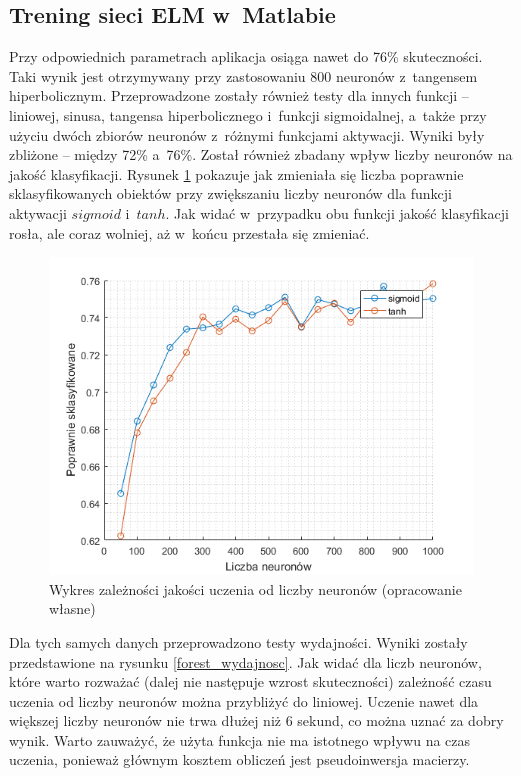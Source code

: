 \documentclass[pl]{minipw} %
\begin{document}
\subsection{Trening sieci ELM w~Matlabie}
Przy odpowiednich parametrach aplikacja osiąga nawet do 76\% skuteczności. 
Taki wynik jest otrzymywany przy zastosowaniu 800 neuronów z~tangensem hiperbolicznym.
Przeprowadzone zostały również testy dla innych funkcji -- liniowej, sinusa, tangensa hiperbolicznego i~funkcji sigmoidalnej, a~także przy użyciu dwóch zbiorów neuronów z~różnymi funkcjami aktywacji.
Wyniki były zbliżone -- między 72\% a~76\%.
\label{matlab-lasy}
Został również zbadany wpływ liczby neuronów na jakość klasyfikacji.
Rysunek \ref{forest_liczba_neuronow} pokazuje jak zmieniała się liczba poprawnie sklasyfikowanych obiektów przy zwiększaniu liczby neuronów dla funkcji aktywacji $sigmoid$ i~$tanh$.
Jak widać w~przypadku obu funkcji jakość klasyfikacji rosła, ale coraz wolniej, aż w~końcu przestała się zmieniać.
\begin{figure}[H]
\centering
\includegraphics[width=\textwidth]{forest_liczba_neuronow.png}
\caption[Wykres zależności jakości uczenia od liczby neuronów]{Wykres zależności jakości uczenia od liczby neuronów (opracowanie własne)}
\label{forest_liczba_neuronow}
\end{figure}

Dla tych samych danych przeprowadzono testy wydajności.
Wyniki zostały przedstawione na rysunku \ref{forest_wydajnosc}.
Jak widać dla liczb neuronów, które warto rozważać (dalej nie następuje wzrost skuteczności) zależność czasu uczenia od liczby neuronów można przybliżyć do liniowej.
Uczenie nawet dla większej liczby neuronów nie trwa dłużej niż 6 sekund, co można uznać za dobry wynik.
Warto zauważyć, że użyta funkcja nie ma istotnego wpływu na czas uczenia, ponieważ głównym kosztem obliczeń jest pseudoinwersja macierzy.
\end{document}
